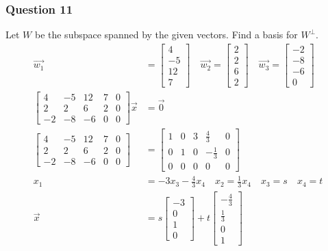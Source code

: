\documentclass{math}
\begin{document}
\subsubsection*{Question 11}
Let \( W \) be the subspace spanned by the given vectors. Find a basis for
\( W^{\bot} \).
\begin{align*}
  \vec{w_1} &= \begin{bmatrix}4 \\ -5 \\ 12 \\ 7\end{bmatrix} \quad
  \vec{w_2} = \begin{bmatrix}2 \\ 2 \\ 6 \\ 2\end{bmatrix} \quad
  \vec{w_3} = \begin{bmatrix}-2 \\ -8 \\ -6 \\ 0\end{bmatrix} \\
  \begin{bmatrix}
    4 & -5 & 12 & 7 & 0 \\
    2 & 2 & 6 & 2 & 0 \\
    -2 & -8 & -6 & 0 & 0
  \end{bmatrix}\vec{x} &= \vec{0} \\
  \left[\begin{array}{cccc|c}
    4 & -5 & 12 & 7 & 0 \\
    2 & 2 & 6 & 2 & 0 \\
    -2 & -8 & -6 & 0 & 0
  \end{array}\right] &= \left[\begin{array}{cccc|c}
    1 & 0 & 3 & \frac{4}{3} & 0 \\
    0 & 1 & 0 & -\frac{1}{3} & 0 \\
    0 & 0 & 0 & 0 & 0
  \end{array}\right] \\
  x_1 &= -3x_3-\frac{4}{3}x_4 \quad x_2 = \frac{1}{3}x_4 \quad x_3 = s \quad
    x_4 = t \\
  \vec{x} &= s\begin{bmatrix}-3 \\ 0 \\ 1 \\ 0\end{bmatrix}+
    t\begin{bmatrix}-\frac{4}{3} \\ \frac{1}{3} \\ 0 \\ 1\end{bmatrix} \\

\end{align*}
\end{document}
